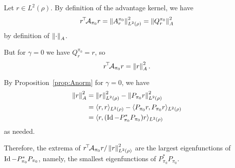 \documentclass[11pt,a4paper]{article}
\newcommand{\AK}{\mathcal{A}}
\begin{document}
\begin{dem}
Let $r\in L^2(\rho)$. By definition of the
advantage kernel, we have
\begin{equation}
\transp{r}
\AK_{\pi_0}r=\norm{A^{\pi_0}_r}^2_{L^2(\rho)}=\norm{Q^{\pi_0}_r}^2_A
\end{equation}
by definition of $\left\lVert\cdot\right\rVert_A$.

But for $\gamma=0$ we have $Q^{\pi_0}_r=r$, so
\begin{equation}
\transp{r}
\AK_{\pi_0}r=\norm{r}^2_A.
\end{equation}

By Proposition~\ref{prop:Anorm} for $\gamma=0$, we have
\begin{align}
\left\lVert r\right\rVert^2_A&=\left\lVert r\right\rVert^2_{L^2(\rho)}-\left\lVert P_{\pi_0} r\right\rVert^2_{L^2(\rho)}
\\&=\langle r,r\rangle_{L^2(\rho)}
-\langle P_{\pi_0} r,P_{\pi_0} r\rangle_{L^2(\rho)}
\\&=\langle r,(\operatorname{Id}-P_{\pi_0}^\ast P_{\pi_0}) r\rangle_{L^2(\rho)}
\end{align}
as needed.

Therefore, the extrema of $\transp{r}\AK_{\pi_0}r/\norm{r}^2_{L^2(\rho)}$
are the largest eigenfunctions of $\operatorname{Id}-P_{\pi_0}^\ast P_{\pi_0}$, namely,
the smallest eigenfunctions of $P_{\pi_0}^\ast P_{\pi_0}$.
\end{dem}
\end{document}

